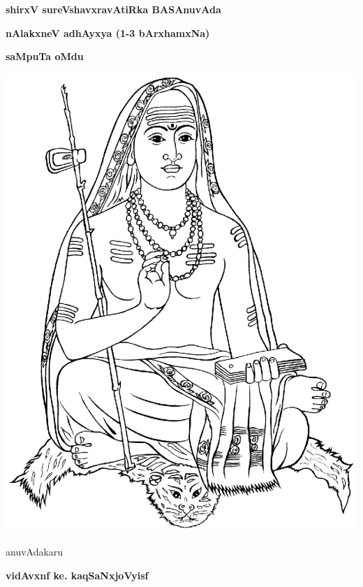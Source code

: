\thispagestyle{empty}
\begin{center}
{\Huge\bfseries shirxV sureVshavxravAtiRka BASAnuvAda}
\bigskip

{\Large\bfseries nAlakxneV adhAyxya (1-3 bArxhamxNa)}
\bigskip

{\Large\bfseries saMpuTa oMdu}
\vfill

\includegraphics[scale=0.7]{figures/shankaracharya.eps}

\vfill

anuvAdakaru
\smallskip

{\large\bfseries vidAvxnf ke. kaqSaNxjoVyisf}


\end{center}

